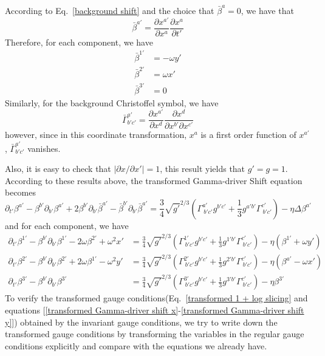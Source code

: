 \documentclass[letterpaper,nofootinbib,prd,amsmath,onecolumn]{revtex4-1}
\begin{document}
According to Eq.~\ref{background shift} and the choice that ${\bar \beta}^{a} = 0$, we have that
\[
{\bar \beta}^{a'} = \frac{\partial x^{a'}}{\partial x^{a}}\frac{\partial x^{a}}{\partial t'}
\]
Therefore, for each component, we have
\begin{align*}
{\bar \beta}^{1'} & = -\omega y'\\
{\bar \beta}^{2'} & = \omega x'\\
{\bar \beta}^{3'} & = 0
\end{align*}
Similarly, for the background Christoffel symbol, we have
\[
{\bar \Gamma}^{a'}_{b'c'} = \frac{\partial x^{a'}}{\partial x^{d}}\frac{\partial x^{d}}{\partial x^{b'}\partial x^{c'}}
\]
however, since in this coordinate transformation, $x^{a}$ is a first order function of $x^{a'}$, ${\bar \Gamma}^{a'}_{b'c'}$ vanishes. 

Also, it is easy to check that $|\partial x/\partial x'| = 1$, this result yields that $g' = g = 1$. According to these results above, the transformed Gamma-driver Shift equation becomes
\begin{equation}
\partial_{t'}\beta^{a'} - \beta^{b'}\partial_{b'}\beta^{a'} + 2\beta^{b'}\partial_{b'}{\bar \beta}^{a'} - {\bar \beta}^{b'}\partial_{b'}{\bar \beta}^{a'} = \frac{3}{4}\sqrt{g'}^{2/3}\left(\Gamma^{a'}_{~b'c'}g^{b'c'} + \frac{1}{3}g^{a'b'}\Gamma^{c'}_{~b'c'}\right) - \eta \Delta \beta^{a'}
\end{equation}
and for each component, we have
\begin{align}
\partial_{t'}\beta^{1'} - \beta^{b'}\partial_{b'}\beta^{1'} - 2\omega\beta^{2'} + \omega^{2}x' &= \frac{3}{4}\sqrt{g'}^{2/3}\left(\Gamma^{1'}_{~b'c'}g^{b'c'} + \frac{1}{3}g^{1'b'}\Gamma^{c'}_{~b'c'}\right) - \eta (\beta^{1'} + \omega y')\label{transformed Gamma-driver shift x}\\
\partial_{t'}\beta^{2'} - \beta^{b'}\partial_{b'}\beta^{2'} + 2\omega\beta^{1'} - \omega^{2}y' &= \frac{3}{4}\sqrt{g'}^{2/3}\left(\Gamma^{2'}_{~b'c'}g^{b'c'} + \frac{1}{3}g^{2'b'}\Gamma^{c'}_{~b'c'}\right) - \eta (\beta^{a'} - \omega x')\label{transformed Gamma-driver shift y}\\
\partial_{t'}\beta^{3'} - \beta^{b'}\partial_{b'}\beta^{3'} & = \frac{3}{4}\sqrt{g'}^{2/3}\left(\Gamma^{3'}_{~b'c'}g^{b'c'} + \frac{1}{3}g^{3'b'}\Gamma^{c'}_{~b'c'}\right) - \eta \beta^{3'}\label{transformed Gamma-driver shift z}
\end{align}
To verify the transformed gauge conditions(Eq.~\ref{transformed 1 + log slicing} and equations [\ref{transformed Gamma-driver shift x}-\ref{transformed Gamma-driver shift y}]) obtained by the invariant gauge conditions, we try to write down the transformed gauge conditions by transforming the variables in the regular gauge conditions explicitly and compare with the equations we already have. 
\end{document}

